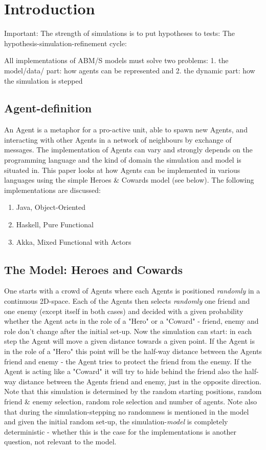 \section{Introduction}

Important: The strength of simulations is to put hypotheses to tests: The hypothesis-simulation-refinement cycle: 

All implementations of ABM/S models must solve two problems: 1. the model/data/ part: how agents can be represented and 2. the dynamic part: how the simulation is stepped

\subsection{Agent-definition}
An Agent is a metaphor for a pro-active unit, able to spawn new Agents, and interacting with other Agents in a network of neighbours by exchange of messages. The implementation of Agents can vary and strongly depends on the programming language and the kind of domain the simulation and model is situated in. This paper looks at how Agents can be implemented in various languages using the simple Heroes \& Cowards model (see below). The following implementations are discussed:

\begin{enumerate}
\item Java, Object-Oriented
\item Haskell, Pure Functional
\item Akka, Mixed Functional with Actors
\end{enumerate}

\subsection{The Model: Heroes and Cowards}
One starts with a crowd of Agents where each Agents is positioned \textit{randomly} in a continuous 2D-space. Each of the Agents then selects \textit{randomly} one friend and one enemy (except itself in both cases) and decided with a given probability whether the Agent acts in the role of a "Hero" or a "Coward" - friend, enemy and role don't change after the initial set-up. Now the simulation can start: in each step the Agent will move a given distance towards a given point. If the Agent is in the role of a "Hero" this point will be the half-way distance between the Agents friend and enemy - the Agent tries to protect the friend from the enemy. If the Agent is acting like a "Coward" it will try to hide behind the friend also the half-way distance between the Agents friend and enemy, just in the opposite direction. \\
Note that this simulation is determined by the random starting positions, random friend \& enemy selection, random role selection and number of agents. Note also that during the simulation-stepping no randomness is mentioned in the model and given the initial random set-up, the simulation-\textit{model} is completely deterministic - whether this is the case for the implementations is another question, not relevant to the model.

